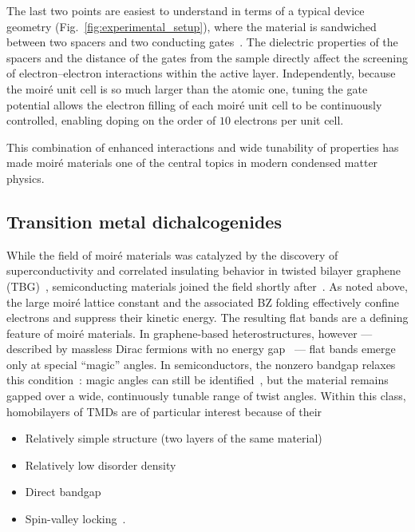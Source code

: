 The last two points are easiest to understand in terms of a typical device geometry (Fig.~\ref{fig:experimental_setup}), where the material is sandwiched between two spacers and two conducting gates~\cite{cai2023signatures}. The dielectric properties of the spacers and the distance of the gates from the sample directly affect the screening of electron--electron interactions within the active layer. Independently, because the moir\'e unit cell is so much larger than the atomic one, tuning the gate potential allows the electron filling of each moir\'e unit cell to be continuously controlled, enabling doping on the order of $10$ electrons per unit cell. %

This combination of enhanced interactions and wide tunability of properties has made moir\'e materials one of the central topics in modern condensed matter physics.

\subsection{Transition metal dichalcogenides}\label{sec:tmds}
While the field of moir\'e materials was catalyzed by the discovery of superconductivity and correlated insulating behavior in twisted bilayer graphene (TBG)~\cite{cao2018correlated, cao2018unconventional}, semiconducting materials joined the field shortly after~\cite{mak2022semiconductor}. As noted above, the large moir\'e lattice constant and the associated BZ folding effectively confine electrons and suppress their kinetic energy. The resulting flat bands are a defining feature of moir\'e materials. In graphene-based heterostructures, however --- described by massless Dirac fermions with no energy gap~\cite{novoselov2005two} --- flat bands emerge only at special ``magic'' angles. In semiconductors, the nonzero bandgap relaxes this condition~\cite{wu2018hubbard}: magic angles can still be identified~\cite{devakul2021magic}, but the material remains gapped over a wide, continuously tunable range of twist angles. Within this class, homobilayers of TMDs are of particular interest because of their
\begin{itemize}
    \item Relatively simple structure (two layers of the same material)
    \item Relatively low disorder density
    \item Direct bandgap
    \item Spin-valley locking~\cite{mak2022semiconductor}.
\end{itemize}

